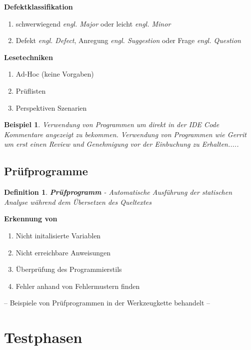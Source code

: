 \documentclass[a4paper]{article}
\theoremstyle{break}
\newtheorem{defi}{Definition}[section]
\newtheorem{ex}{Beispiel}[section]
\begin{document}
          \textbf{Defektklassifikation}
          \begin{enumerate}
          \item schwerwiegend \textit{engl. Major} oder leicht \textit{engl. Minor}
            \item Defekt \textit{engl. Defect}, Anregung \textit{engl. Suggestion} oder Frage \textit{engl. Question}
          \end{enumerate}

          \textbf{Lesetechniken}
          \begin{enumerate}
          \item Ad-Hoc (keine Vorgaben)
          \item Pr\"uflisten
          \item Perspektiven Szenarien
          \end{enumerate}

          \begin{ex}
            Verwendung von Programmen um direkt in der IDE Code Kommentare angezeigt zu bekommen.
            Verwendung von Programmen wie Gerrit um erst einen Review und Genehmigung vor der Einbuchung zu Erhalten.....
          \end{ex}
          
          \subsection{Prüfprogramme}

          \begin{defi}
            \textbf{Pr\"ufprogramm} - Automatische Ausf\"uhrung der statischen Analyse w\"ahrend dem \"Ubersetzen des Queltextes
          \end{defi}

          \textbf{Erkennung von}
          \begin{enumerate}
          \item Nicht initalisierte Variablen
          \item Nicht erreichbare Anweisungen
          \item Überprüfung des Programmierstils
          \item Fehler anhand von Fehlermustern finden
          \end{enumerate}

          -- Beispiele von Prüfprogrammen in der Werkzeugkette behandelt --
          
          \section{Testphasen}
          
\end{document}
